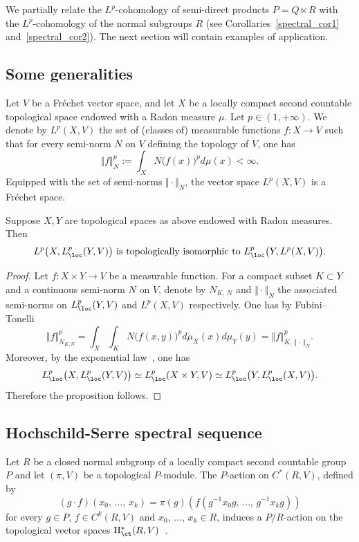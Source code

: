 We partially relate the $L^p$-cohomology of semi-direct products $P = Q \ltimes R$ with the $L^p$-cohomology of the normal subgroups $R$ (see Corollaries~\ref{spectral_cor1} and~\ref{spectral_cor2}). The next section will contain examples of application.

\subsection*{Some generalities}

Let $V$ be a Fréchet vector space, and let $X$ be a locally compact second countable topological space endowed with a Radon measure $\mu$. Let $p \in (1, +\infty)$. We denote by $L^p(X, V)$ the set of (classes of) measurable functions $f: X \to V$ such that for every semi-norm $N$ on $V$ defining the topology of $V$, one has
\[
\Vert f \Vert _N ^p:= \int _X N\bigl(f(x)\bigr) ^p d\mu (x) < \infty.
\]
Equipped with the set of semi-norms $\Vert \cdot \Vert _N$, the vector space $L^p(X,V)$ is a Fréchet space.



\begin{prop}\label{generalities_prop2}
Suppose $X, Y$ are topological spaces as above endowed with Radon measures. Then
\[
L^p\bigl(X, L_{\loc}^p (Y, V)\bigr) \text{ is topologically isomorphic to }L_{\loc}^p \bigl(Y, L^p (X,V)\bigr).
\]
\end{prop}

\begin{proof}
Let $f: X \times Y \to V$ be a measurable function.
For a compact subset $K \subset Y$ and a continuous semi-norm $N$ on $V$, denote by $N_{K,\,N}$ and $\Vert \cdot \Vert _N$ the associated semi-norms on $L_{\loc}^p (Y, V)$ and $L^p (X,V)$ respectively. One has by Fubini--Tonelli
\[
\Vert f \Vert _{N_{K, N}} ^p
= \int _X \int _K N\bigl(f(x,y)\bigr) ^p d\mu_X (x) d\mu _Y (y)= \Vert f \Vert _{K,\, \Vert\,\cdot\,\Vert _N} ^p.
\]
Moreover, by the exponential law~\cite[Lemma~1.4]{Bl}, one has
\[
L_{\loc} ^p \bigl(X, L_{\loc} ^p(Y, V)\bigr) \simeq L_{\loc} ^p (X \times Y, V) \simeq
L_{\loc} ^p \bigl(Y, L_{\loc} ^p(X, V)\bigr).
\]
Therefore the proposition follows.
\end{proof}


\subsection*{Hochschild-Serre spectral sequence}

Let $R$ be a closed normal subgroup of a locally compact second countable group $P$ and let $(\pi, V)$ be a topological $P$-module. The $P$-action on $C^*(R,V)$, defined by
\[
(g \cdot f) (x_0,\,\dots,\,x_k) = \pi (g)\left(f\left(g^{-1} x_0 g,\,\dots,\,g^{-1} x_k g\right)\right)
\]
for every $g \in P$, $f \in C^k (R,V)$ and $x_0,\,\dots,\,x_k \in R$, induces a $P/R$-action on the topological vector spaces ${\rm H}_{\ct} ^*(R, V)$~\cite[p.~50]{Gui}.

